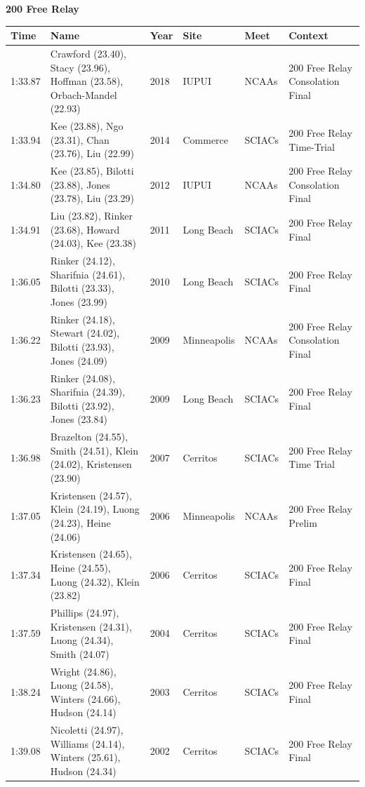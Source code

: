 \noindent\begin{minipage}[t]{0.98\textwidth}
\centering
\textbf{\textcolor{teamprimary}{200 Free Relay}}\par
\vspace{0.5em}
\centering
\small
\renewcommand{\arraystretch}{1.0}
\setlength{\tabcolsep}{4pt}
\begin{tabular}{@{}p{2.0cm}p{3.2cm}p{1.2cm}p{2.0cm}p{2.0cm}p{2.5cm}@{}}
\toprule
\textbf{Time} & \textbf{Name} & \textbf{Year} & \textbf{Site} & \textbf{Meet} & \textbf{Context} \\
\midrule
1:33.87 & Crawford (23.40), Stacy (23.96), Hoffman (23.58), Orbach-Mandel (22.93) & 2018 & IUPUI & NCAAs & 200 Free Relay Consolation Final \\
1:33.94 & Kee (23.88), Ngo (23.31), Chan (23.76), Liu (22.99) & 2014 & Commerce & SCIACs & 200 Free Relay Time-Trial \\
1:34.80 & Kee (23.85), Bilotti (23.88), Jones (23.78), Liu (23.29) & 2012 & IUPUI & NCAAs & 200 Free Relay Consolation Final \\
1:34.91 & Liu (23.82), Rinker (23.68), Howard (24.03), Kee (23.38) & 2011 & Long Beach & SCIACs & 200 Free Relay Final \\
1:36.05 & Rinker (24.12), Sharifnia (24.61), Bilotti (23.33), Jones (23.99) & 2010 & Long Beach & SCIACs & 200 Free Relay Final \\
1:36.22 & Rinker (24.18), Stewart (24.02), Bilotti (23.93), Jones (24.09) & 2009 & Minneapolis & NCAAs & 200 Free Relay Consolation Final \\
1:36.23 & Rinker (24.08), Sharifnia (24.39), Bilotti (23.92), Jones (23.84) & 2009 & Long Beach & SCIACs & 200 Free Relay Final \\
1:36.98 & Brazelton (24.55), Smith (24.51), Klein (24.02), Kristensen (23.90) & 2007 & Cerritos & SCIACs & 200 Free Relay Time Trial \\
1:37.05 & Kristensen (24.57), Klein (24.19), Luong (24.23), Heine (24.06) & 2006 & Minneapolis & NCAAs & 200 Free Relay Prelim \\
1:37.34 & Kristensen (24.65), Heine (24.55), Luong (24.32), Klein (23.82) & 2006 & Cerritos & SCIACs & 200 Free Relay Final \\
1:37.59 & Phillips (24.97), Kristensen (24.31), Luong (24.34), Smith (24.07) & 2004 & Cerritos & SCIACs & 200 Free Relay Final \\
1:38.24 & Wright (24.86), Luong (24.58), Winters (24.66), Hudson (24.14) & 2003 & Cerritos & SCIACs & 200 Free Relay Final \\
1:39.08 & Nicoletti (24.97), Williams (24.14), Winters (25.61), Hudson (24.34) & 2002 & Cerritos & SCIACs & 200 Free Relay Final \\
\bottomrule
\end{tabular}
\end{minipage}
